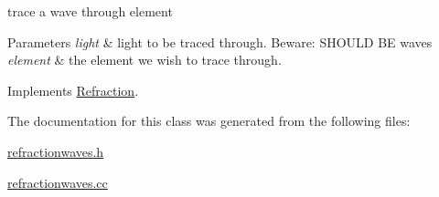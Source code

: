 trace a wave through element 


\begin{DoxyParams}{Parameters}
{\em light} & light to be traced through. Beware\+: S\+H\+O\+U\+LD BE waves \\
\hline
{\em element} & the element we wish to trace through. \\
\hline
\end{DoxyParams}


Implements \hyperlink{classRefraction}{Refraction}.



The documentation for this class was generated from the following files\+:\begin{DoxyCompactItemize}
\item 
\hyperlink{refractionwaves_8h}{refractionwaves.\+h}\item 
\hyperlink{refractionwaves_8cc}{refractionwaves.\+cc}\end{DoxyCompactItemize}
